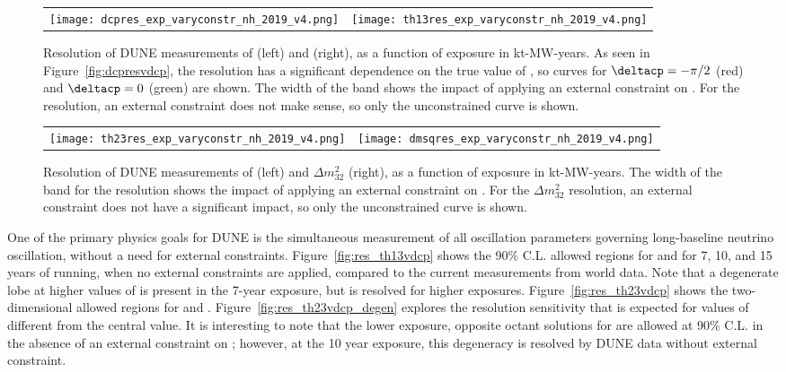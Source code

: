 \begin{figure}[h!]
    \centering
    \begin{tabular}{cc}
		\texttt{[image: dcpres\_exp\_varyconstr\_nh\_2019\_v4.png]} &
		\texttt{[image: th13res\_exp\_varyconstr\_nh\_2019\_v4.png]} 
	\end{tabular}  
	\caption[Resolution of DUNE measurements of \deltacp and , as a function of exposure]{Resolution of DUNE measurements of \deltacp (left) and  (right), as a function of exposure in kt-MW-years. As seen in Figure~\ref{fig:dcpresvdcp}, the \deltacp resolution has a significant dependence on the true value of \deltacp, so curves for $\deltacp=-\pi/2$ (red) and $\deltacp=0$ (green) are shown. The width of the band shows the impact of applying an external constraint on . For the  resolution, an external constraint does not make sense, so only the unconstrained curve is shown.}
    \label{fig:appres_exp}
\end{figure}

\begin{figure}[h!]
    \centering
    \begin{tabular}{cc}
		\texttt{[image: th23res\_exp\_varyconstr\_nh\_2019\_v4.png]} &
		\texttt{[image: dmsqres\_exp\_varyconstr\_nh\_2019\_v4.png]} 
	\end{tabular}  
	\caption[Resolution of DUNE measurements of \deltacp and , as a function of exposure]{Resolution of DUNE measurements of  (left) and $\Delta m^{2}_{32}$ (right), as a function of exposure in kt-MW-years. The width of the band for the  resolution shows the impact of applying an external constraint on . For the $\Delta m^{2}_{32}$ resolution, an external constraint does not have a significant impact, so only the unconstrained curve is shown.}
    \label{fig:disres_exp}
\end{figure}

One of the primary physics goals for DUNE is the simultaneous measurement of all oscillation parameters governing long-baseline neutrino oscillation, without a need for external constraints. Figure~\ref{fig:res_th13vdcp} shows the 90\% C.L. allowed regions for  and \deltacp for 7, 10, and 15 years of running, when no external constraints are applied, compared to the current measurements from world data. Note that a degenerate lobe at higher values of  is present in the 7-year exposure, but is resolved for higher exposures. Figure~\ref{fig:res_th23vdcp} shows the two-dimensional allowed regions for  and \deltacp. Figure~\ref{fig:res_th23vdcp_degen} explores the resolution sensitivity that is expected for values of  different from the  central value. It is interesting to note that the lower exposure, opposite octant solutions for  are allowed at 90\% C.L. in the absence of an external constraint on ; however, at the 10 year exposure, this degeneracy is resolved by DUNE data without external constraint.

